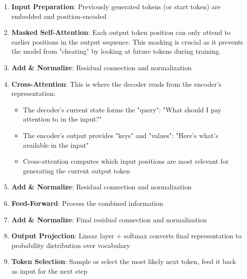 \begin{enumerate}
  \item \textbf{Input Preparation}: Previously generated tokens (or start token) are embedded and position-encoded

  \item \textbf{Masked Self-Attention}: Each output token position can only attend to earlier positions in the output sequence. This masking is crucial as it prevents the model from "cheating" by looking at future tokens during training.

  \item \textbf{Add \& Normalize}: Residual connection and normalization

  \item \textbf{Cross-Attention}: This is where the decoder reads from the encoder's representation:
    \begin{itemize}
      \item The decoder's current state forms the "query": "What should I pay attention to in the input?"
      \item The encoder's output provides "keys" and "values": "Here's what's available in the input"
      \item Cross-attention computes which input positions are most relevant for generating the current output token
    \end{itemize}

  \item \textbf{Add \& Normalize}: Residual connection and normalization

  \item \textbf{Feed-Forward}: Process the combined information

  \item \textbf{Add \& Normalize}: Final residual connection and normalization

  \item \textbf{Output Projection}: Linear layer + softmax converts final representation to probability distribution over vocabulary

  \item \textbf{Token Selection}: Sample or select the most likely next token, feed it back as input for the next step
\end{enumerate}
